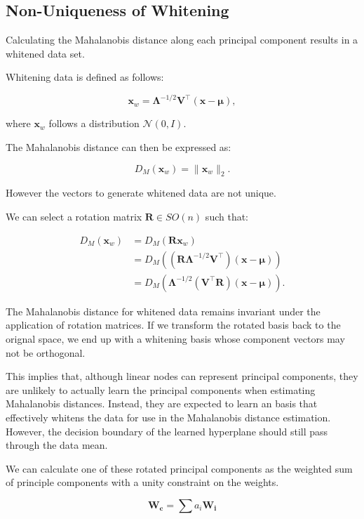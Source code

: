 \subsection{Non-Uniqueness of Whitening}

Calculating the Mahalanobis distance along each principal component results in a whitened data set. 

Whitening data is defined as follows:

\[
\mathbf{x}_w = \boldsymbol{\Lambda}^{-1/2} \mathbf{V}^\top (\mathbf{x} - \boldsymbol{\mu}),
\]

where \(\mathbf{x}_w\) follows a distribution \(\mathcal{N}(0, I)\).

The Mahalanobis distance can then be expressed as:

\[
D_M(\mathbf{x}_w) = \|\mathbf{x}_w\|_2.
\]

However the vectors to generate whitened data are not unique.

We can select a rotation matrix \(\mathbf{R} \in SO(n)\) such that:

\begin{align}
    D_M(\mathbf{x}_w) &= D_M(\mathbf{R} \mathbf{x}_w) \\
                      &= D_M\left( (\mathbf{R} \boldsymbol{\Lambda}^{-1/2} \mathbf{V}^\top) (\mathbf{x} - \boldsymbol{\mu}) \right) \\
                      &= D_M\left( \boldsymbol{\Lambda}^{-1/2} (\mathbf{V}^\top \mathbf{R}) (\mathbf{x} - \boldsymbol{\mu}) \right).
    \end{align}
    
The Mahalanobis distance for whitened data remains invariant under the application of rotation matrices. If we transform the rotated basis back to the orignal space, we end up with a whitening basis whose component vectors may not be orthogonal.

This implies that, although linear nodes can represent principal components, they are unlikely to actually learn the principal components when estimating Mahalanobis distances. Instead, they are expected to learn an basis that effectively whitens the data for use in the Mahalanobis distance estimation. However, the decision boundary of the learned hyperplane should still pass through the data mean.

We can calculate one of these rotated principal components as the weighted sum of principle components with a unity constraint on the weights.

\begin{equation}
    \label{eq:pc_mixture}
    \boldsymbol{W_c} = \sum a_i \mathbf{W_i}
\end{equation}

